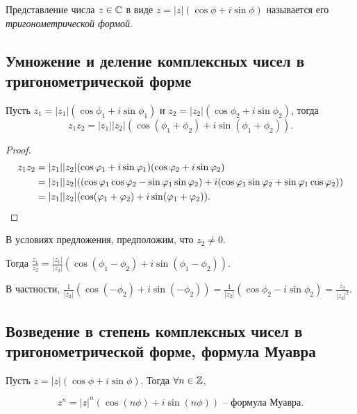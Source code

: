 \begin{definition}
    Представление числа $z \in \CC$ в виде $z = |z|(\cos \phi + i \sin \phi)$ называется его \textit{тригонометрической формой}.
\end{definition}


\subsection{Умножение и деление комплексных чисел в тригонометрической форме}

\begin{proposal}
    Пусть $z_1 = |z_1| (\cos \phi_1 + i \sin \phi_1)$ и $z_2 = |z_2| (\cos \phi_2 + i \sin \phi_2)$, тогда
    \begin{equation*}
        z_1 z_2 = |z_1| |z_2| (\cos (\phi_1 + \phi_2) + i \sin(\phi_1 + \phi_2))
    .\end{equation*}
\end{proposal}

\begin{proof}
    \begin{align*}
        z_1 z_2 &= |z_1||z_2|(\cos \phi_1 + i \sin \phi_1)(\cos \phi_2 + i \sin \phi_2)  \\
                &= |z_1||z_2|((\cos \phi_1 \cos \phi_2 - \sin \phi_1 \sin \phi_2) + i(\cos \phi_1 \sin \phi_2 + \sin \phi_1 \cos \phi_2)) \\
                &= |z_1||z_2|(\cos (\phi_1 + \phi_2) + i \sin(\phi_1 + \phi_2)) \qedhere
    .\end{align*}
\end{proof}

\begin{corollary}
    В условиях предложения, предположим, что $z_2 \neq 0$.

    Тогда $\frac{z_1}{z_2} = \frac{|z_1|}{|z_2|} (\cos (\phi_1 - \phi_2) + i \sin(\phi_1 - \phi_2))$.

    В частности, $\frac{1}{|z_2|}(\cos(- \phi_2) + i\sin(- \phi_2)) = \frac{1}{|z_2|}(\cos \phi_2 - i \sin \phi_2) = \frac{\overline{z}_2}{|z_2|^2}$.
\end{corollary}

\subsection{Возведение в степень комплексных чисел в тригонометрической форме, формула Муавра}

\begin{corollary}
    Пусть $z = |z|(\cos \phi + i \sin \phi)$. Тогда $\forall n \in \ZZ$,

    \begin{equation*}
        z^n = |z|^n (\cos(n \phi) + i \sin(n \phi)) \text{ -- формула Муавра}
    .\end{equation*}
\end{corollary}

